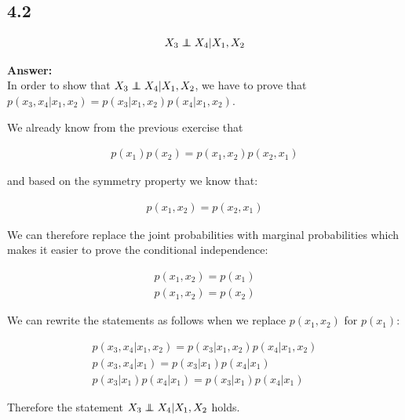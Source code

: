 \documentclass[a4paper]{article}
\newcommand\independent{\protect\mathpalette{\protect\independenT}{\perp}}
\def\independenT#1#2{\mathrel{\rlap{$#1#2$}\mkern2mu{#1#2}}}
\begin{document}
\subsection*{4.2}

\begin{align*}
	X_3 \independent X_4 | X_1,X_2
\end{align*}

\textbf{Answer:}\\

In order to show that $X_3 \independent X_4 | X_1,X_2$, we have to prove that $p(x_3, x_4 | x_1, x_2) = p(x_3 | x_1, x_2)p(x_4 | x_1, x_2)$. 

We already know from the previous exercise that 

\begin{align*}
	p(x_1)p(x_2) = p(x_1,x_2)p(x_2,x_1)
\end{align*}

and based on the symmetry property we know that:

\begin{align*}
	p(x_1,x_2) = p(x_2,x_1)
\end{align*}

We can therefore replace the joint probabilities with marginal probabilities which makes it easier to prove the conditional independence:

\begin{align*}
	p(x_1,x_2) = p(x_1)\\
	p(x_1,x_2) = p(x_2)
\end{align*}

We can rewrite the statements as follows when we replace $p(x_1,x_2)$ for $p(x_1)$:

\begin{align*}
p(x_3, x_4 | x_1, x_2) = p(x_3 | x_1, x_2)p(x_4 | x_1, x_2)\\
p(x_3,x_4|x_1) = p(x_3|x_1)p(x_4|x_1)\\
p(x_3|x_1)p(x_4|x_1) = p(x_3|x_1)p(x_4|x_1)
\end{align*}

Therefore the statement $X_3 \independent X_4 | X_1,X_2$ holds.
\end{document}
